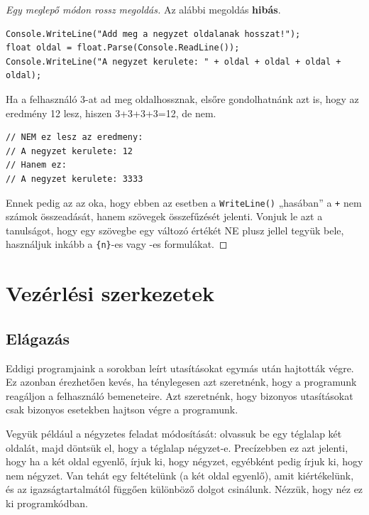 \documentclass[a4paper]{article}
\begin{document}
\begin{proof}[Egy meglepő módon rossz megoldás]
Az alábbi megoldás \textbf{hibás}.

\begin{lstlisting}[caption=Négyzet kerülete -- hibás megoldás, label=lst:slnSquareWrong]
Console.WriteLine("Add meg a negyzet oldalanak hosszat!");
float oldal = float.Parse(Console.ReadLine());
Console.WriteLine("A negyzet kerulete: " + oldal + oldal + oldal + oldal);
\end{lstlisting}

Ha a felhasználó 3-at ad meg oldalhossznak, elsőre gondolhatnánk azt is, hogy az eredmény 12 lesz, hiszen 3+3+3+3=12, de nem.

\begin{lstlisting}[caption=Négyzet kerülete -- hibás megoldás kimenete, label=lst:slnSquarewrongOutput]
// NEM ez lesz az eredmeny:
// A negyzet kerulete: 12
// Hanem ez:
// A negyzet kerulete: 3333
\end{lstlisting}

Ennek pedig az az oka, hogy ebben az esetben a \lstinline{WriteLine()} „hasában” a \lstinline{+} nem számok összeadását, hanem szövegek összefűzését jelenti. Vonjuk le azt a tanulságot, hogy egy szövegbe egy változó értékét NE plusz jellel tegyük bele, használjuk inkább a \lstinline!{n}!-es vagy \within{\lstinline{\$\{\}}}-es formulákat.
\end{proof}

\section{Vezérlési szerkezetek}
\subsection{Elágazás}
Eddigi programjaink a sorokban leírt utasításokat egymás után hajtották végre. Ez azonban érezhetően kevés, ha ténylegesen azt szeretnénk, hogy a programunk reagáljon a felhasználó bemeneteire. Azt szeretnénk, hogy bizonyos utasításokat csak bizonyos esetekben hajtson végre a programunk.

Vegyük például a négyzetes feladat módosítását: olvassuk be egy téglalap két oldalát, majd döntsük el, hogy a téglalap négyzet-e. Precízebben ez azt jelenti, hogy ha a két oldal egyenlő, írjuk ki, hogy négyzet, egyébként pedig írjuk ki, hogy nem négyzet. Van tehát egy feltételünk (a két oldal egyenlő), amit kiértékelünk, és az igazságtartalmától függően különböző dolgot csinálunk. Nézzük, hogy néz ez ki programkódban.
\end{document}
